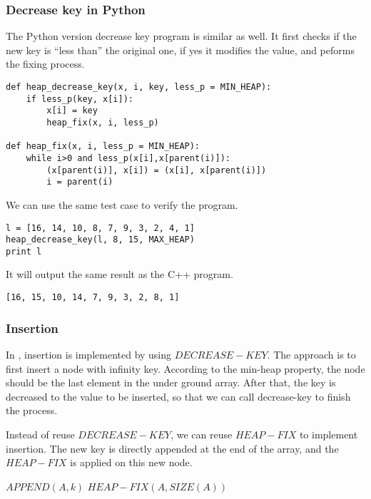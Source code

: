 \documentclass{article}
\begin{document}
\subsubsection*{Decrease key in Python}
The Python version decrease key program is similar as well. It first
checks if the new key is ``less than'' the original one, if yes it
modifies the value, and peforms the fixing process.

\lstset{language=Python}
\begin{lstlisting}
def heap_decrease_key(x, i, key, less_p = MIN_HEAP):
    if less_p(key, x[i]):
        x[i] = key
        heap_fix(x, i, less_p)

def heap_fix(x, i, less_p = MIN_HEAP):
    while i>0 and less_p(x[i],x[parent(i)]):
        (x[parent(i)], x[i]) = (x[i], x[parent(i)])
        i = parent(i)
\end{lstlisting}

We can use the same test case to verify the program.

\begin{lstlisting}
l = [16, 14, 10, 8, 7, 9, 3, 2, 4, 1]
heap_decrease_key(l, 8, 15, MAX_HEAP)
print l
\end{lstlisting}

It will output the same result as the C++ program.

\begin{verbatim}
[16, 15, 10, 14, 7, 9, 3, 2, 8, 1]
\end{verbatim}

\subsubsection{Insertion}

In \cite{CLRS}, insertion is implemented by using $DECREASE-KEY$.
The approach is to first insert a node with infinity key. According
to the min-heap property, the node should be the last element
in the under ground array. After that, the key is decreased to
the value to be inserted, so that we can call decrease-key to
finish the process.

Instead of reuse $DECREASE-KEY$, we can reuse $HEAP-FIX$ to implement
insertion. The new key is directly appended at the end of the array,
and the $HEAP-FIX$ is applied on this new node.

\begin{algorithmic}[1]
  \State $APPEND(A, k)$
  \State $HEAP-FIX(A, SIZE(A))$
\EndFunction
\end{algorithmic}
\end{document}
